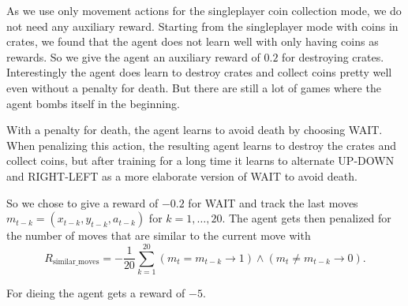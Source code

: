 
As we use only movement actions for the singleplayer coin collection mode, we do not need any auxiliary reward. Starting from the singleplayer mode with coins in crates, we found that the agent does not learn well with only having coins as rewards. So we give the agent an auxiliary reward of $0.2$ for destroying crates.
Interestingly the agent does learn to destroy crates and collect coins pretty well even without a penalty for death. But there are still a lot of games where the agent bombs itself in the beginning.

With a penalty for death, the agent learns to avoid death by choosing WAIT. When penalizing this action, the resulting agent learns to destroy the crates and collect coins, but after training for a long time it learns to alternate UP-DOWN and RIGHT-LEFT as a more elaborate version of WAIT to avoid death.

So we chose to give a reward of $-0.2$ for WAIT and track the last moves $m_{t-k} = (x_{t-k}, y_{t-k}, a_{t-k})$ for $k=1,\dots,20$. The agent gets then penalized for the number of moves that are similar to the current move with
$$
R_{\text{similar\_moves}} = - \frac{1}{20} \sum_{k=1}^{20} (m_t = m_{t-k} \rightarrow 1) \land(m_t \neq m_{t-k} \rightarrow 0).
$$

For dieing the agent gets a reward of $-5$.
